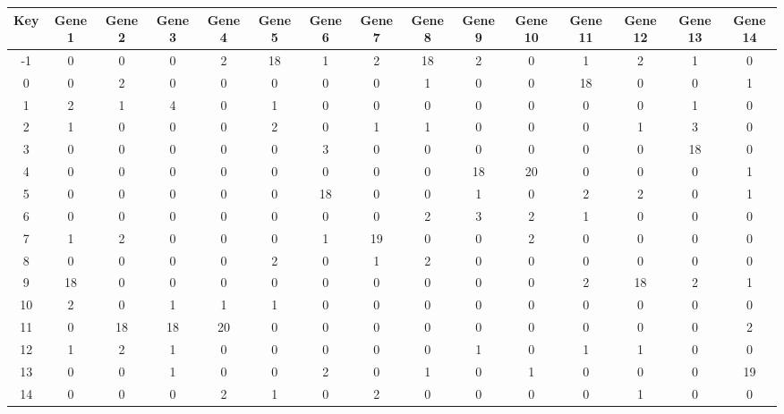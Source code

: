\begin{tabular}{|c|c|c|c|c|c|c|c|c|c|c|c|c|c|c|}
\hline
Key & Gene 1 & Gene 2 & Gene 3 & Gene 4 & Gene 5 & Gene 6 & Gene 7 & Gene 8 & Gene 9 & Gene 10 & Gene 11 & Gene 12 & Gene 13 & Gene 14 \\
\hline
-1 & 0 & 0 & 0 & 2 & 18 & 1 & 2 & 18 & 2 & 0 & 1 & 2 & 1 & 0 \\
0 & 0 & 2 & 0 & 0 & 0 & 0 & 0 & 1 & 0 & 0 & 18 & 0 & 0 & 1 \\
1 & 2 & 1 & 4 & 0 & 1 & 0 & 0 & 0 & 0 & 0 & 0 & 0 & 1 & 0 \\
2 & 1 & 0 & 0 & 0 & 2 & 0 & 1 & 1 & 0 & 0 & 0 & 1 & 3 & 0 \\
3 & 0 & 0 & 0 & 0 & 0 & 3 & 0 & 0 & 0 & 0 & 0 & 0 & 18 & 0 \\
4 & 0 & 0 & 0 & 0 & 0 & 0 & 0 & 0 & 18 & 20 & 0 & 0 & 0 & 1 \\
5 & 0 & 0 & 0 & 0 & 0 & 18 & 0 & 0 & 1 & 0 & 2 & 2 & 0 & 1 \\
6 & 0 & 0 & 0 & 0 & 0 & 0 & 0 & 2 & 3 & 2 & 1 & 0 & 0 & 0 \\
7 & 1 & 2 & 0 & 0 & 0 & 1 & 19 & 0 & 0 & 2 & 0 & 0 & 0 & 0 \\
8 & 0 & 0 & 0 & 0 & 2 & 0 & 1 & 2 & 0 & 0 & 0 & 0 & 0 & 0 \\
9 & 18 & 0 & 0 & 0 & 0 & 0 & 0 & 0 & 0 & 0 & 2 & 18 & 2 & 1 \\
10 & 2 & 0 & 1 & 1 & 1 & 0 & 0 & 0 & 0 & 0 & 0 & 0 & 0 & 0 \\
11 & 0 & 18 & 18 & 20 & 0 & 0 & 0 & 0 & 0 & 0 & 0 & 0 & 0 & 2 \\
12 & 1 & 2 & 1 & 0 & 0 & 0 & 0 & 0 & 1 & 0 & 1 & 1 & 0 & 0 \\
13 & 0 & 0 & 1 & 0 & 0 & 2 & 0 & 1 & 0 & 1 & 0 & 0 & 0 & 19 \\
14 & 0 & 0 & 0 & 2 & 1 & 0 & 2 & 0 & 0 & 0 & 0 & 1 & 0 & 0 \\
\hline
\end{tabular}